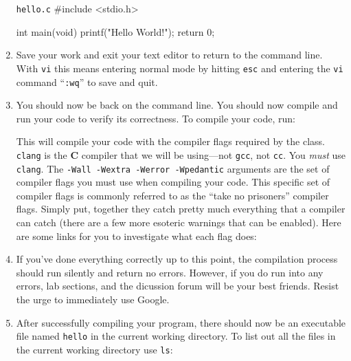 \documentclass[11pt]{article}
\begin{document}
\begin{enumerate}
\begin{clisting}{\texttt{hello.c}}
#include <stdio.h>

int main(void) {
    printf("Hello World!\n");
    return 0;
}
\end{clisting}

  \item Save your work and exit your text editor to return to the command line.
    With \texttt{vi} this means entering normal mode by hitting \texttt{esc} and
    entering the \texttt{vi} command ``\texttt{:wq}'' to save and quit.

  \item You should now be back on the command line. You should now compile and
    run your code to verify its correctness. To compile your code, run:


    This will compile your code with the compiler flags required by the class.
    \texttt{clang} is the \textbf{C} compiler that we will be using---not
    \texttt{gcc}, not \texttt{cc}. You \emph{must} use \texttt{clang}. The
    \texttt{-Wall -Wextra -Werror -Wpedantic} arguments are the set of compiler
    flags you must use when compiling your code. This specific set of compiler
    flags is commonly referred to as the ``take no prisoners'' compiler flags.
    Simply put, together they catch pretty much everything that a compiler can
    catch (there are a few more esoteric warnings that can be enabled). Here are
    some links for you to investigate what each flag does:



  \item If you've done everything correctly up to this point, the compilation
    process should run silently and return no errors. However, if you do run
    into any errors, lab sections, and the dicussion forum will be your best friends. Resist
    the urge to immediately use Google.

  \item After successfully compiling your program, there should now be an
    executable file named \texttt{hello} in the current working directory. To
    list out all the files in the current working directory use \texttt{ls}:


\end{enumerate}
\end{document}
